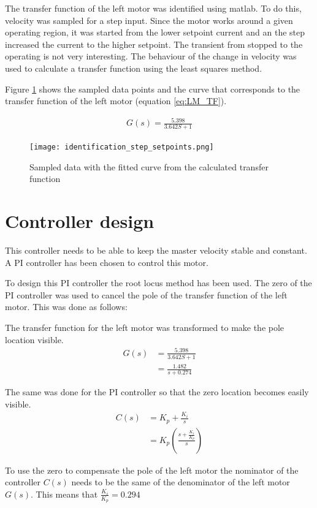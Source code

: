 The transfer function of the left motor was identified using matlab. To do this, velocity was sampled for a step input. Since the motor works around a given operating region, it was started from the lower setpoint current and an the step increased the current to the higher setpoint. The transient from stopped to the operating is not very interesting. The behaviour of the change in velocity was used to calculate a transfer function using the least squares method. 

Figure \ref{fig:LM_id} shows the sampled data points and the curve that corresponds to the transfer function of the left motor (equation \ref{eq:LM_TF}).

\begin{align}
	G(s) = \frac{5.398}{3.642S+1}
    \label{eq:LM_TF}
\end{align}

\begin{figure}[htbp]
\centering
\texttt{[image: identification\_step\_setpoints.png]}
\caption{Sampled data with the fitted curve from the calculated transfer function}
\label{fig:LM_id}
\end{figure}

\FloatBarrier
\section{Controller design}
This controller needs to be able to keep the master velocity stable and constant. A PI controller has been chosen to control this motor. 

To design this PI controller the root locus method has been used. The zero of the PI controller was used to cancel the pole of the transfer function of the left motor. This was done as follows:

The transfer function for the left motor was transformed to make the pole location visible.
\begin{align}
	G(s) &= \frac{5.398}{3.642S+1} \\[12pt]
    &= \frac{1.482}{s+0.274} \nonumber
\end{align}

The same was done for the PI controller so that the zero location becomes easily visible.
\begin{align}
    C(s) &= K_p + \frac{K_i}{s}\\[12pt]
    &= K_p \left(\frac{s+\frac{K_i}{K_p}}{s} \right) \nonumber
\end{align}

To use the zero to compensate the pole of the left motor the nominator of the controller $C(s)$ needs to be the same of the denominator of the left motor $G(s)$. This means that $\frac{K_i}{K_p} = 0.294$

